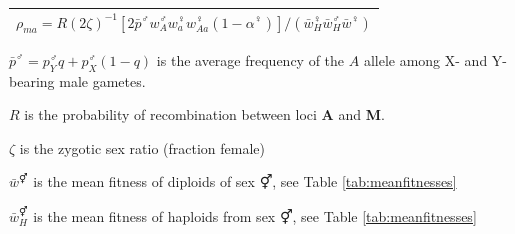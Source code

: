 \documentclass[12pt]{article}
\begin{document}
\begin{threeparttable}[ht]
\begin{tabular}{l}
  $\rho_{ma} = R \left( 2 \zeta \right)^{-1} \left[ 2\bar{p}^{\male} w_{A}^{\male} w_{a}^{\female} w_{Aa}^{\female} (1-\alpha^{\female}) \right] / \left(\bar{w}_H^\female \bar{w}_H^\male \bar{w}^\female \right) $\\ [1ex] 
  \hline \hline 
   \end{tabular}
      \begin{tablenotes}
      \scriptsize
      \item $\bar{p}^{\male}=p_{Y}^{\male}q+p_{X}^{\male}(1-q)$ is the average frequency of the $A$ allele among X- and Y-bearing male gametes.
      \item $R$ is the probability of recombination between loci \textbf{A} and \textbf{M}.
      \item $\zeta$ is the zygotic sex ratio (fraction female)
      \item $\bar{w}^\Hermaphrodite$ is the mean fitness of diploids of sex $\Hermaphrodite$, see Table \ref{tab:meanfitnesses}
      \item $\bar{w}_H^\Hermaphrodite$ is the mean fitness of haploids from sex $\Hermaphrodite$, see Table \ref{tab:meanfitnesses}
    \end{tablenotes}
  \label{tab:haplotype_growth}
\end{threeparttable}
\\
\end{document}
